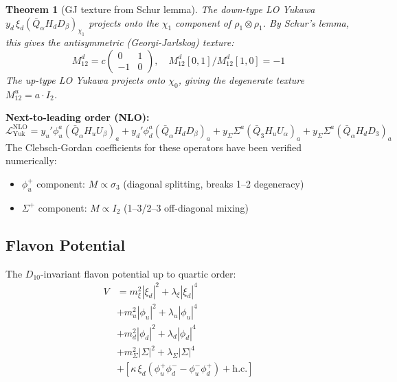 \documentclass[11pt,a4paper]{article}
\newtheorem{theorem}{Theorem}
\begin{document}
\begin{theorem}[GJ texture from Schur lemma]
The down-type LO Yukawa $y_d \, \xi_d (\bar{Q}_\alpha H_d D_\beta)_{\chi_1}$ projects onto the $\chi_1$ component of $\rho_1 \otimes \rho_1$. By Schur's lemma, this gives the antisymmetric (Georgi-Jarlskog) texture:
\begin{equation}
M^d_{12} = c \begin{pmatrix} 0 & 1 \\ -1 & 0 \end{pmatrix}, \quad M^d_{12}[0,1]/M^d_{12}[1,0] = -1
\end{equation}
The up-type LO Yukawa projects onto $\chi_0$, giving the degenerate texture $M^u_{12} = a \cdot I_2$.
\end{theorem}

\textbf{Next-to-leading order (NLO):}
\begin{equation}
\mathcal{L}_{\text{Yuk}}^{\text{NLO}} = y_u' \phi_u^a (\bar{Q}_\alpha H_u U_\beta)_a + y_d' \phi_d^a (\bar{Q}_\alpha H_d D_\beta)_a + y_\Sigma \Sigma^a (\bar{Q}_3 H_u U_\alpha)_a + y_\Sigma \Sigma^a (\bar{Q}_\alpha H_d D_3)_a
\end{equation}
The Clebsch-Gordan coefficients for these operators have been verified numerically:
\begin{itemize}
\item $\phi_u^+$ component: $M \propto \sigma_3$ (diagonal splitting, breaks 1--2 degeneracy)
\item $\Sigma^+$ component: $M \propto I_2$ (1--3/2--3 off-diagonal mixing)
\end{itemize}

\subsection{Flavon Potential}

The $D_{10}$-invariant flavon potential up to quartic order:
\begin{equation}
\begin{aligned}
V &= m_\xi^2 |\xi_d|^2 + \lambda_\xi |\xi_d|^4 \\
  &+ m_u^2 |\phi_u|^2 + \lambda_u |\phi_u|^4 \\
  &+ m_d^2 |\phi_d|^2 + \lambda_d |\phi_d|^4 \\
  &+ m_\Sigma^2 |\Sigma|^2 + \lambda_\Sigma |\Sigma|^4 \\
  &+ \left[\kappa \, \xi_d \left(\phi_u^+ \phi_d^- - \phi_u^- \phi_d^+\right) + \text{h.c.}\right]
\end{aligned}
\end{equation}
\end{document}
